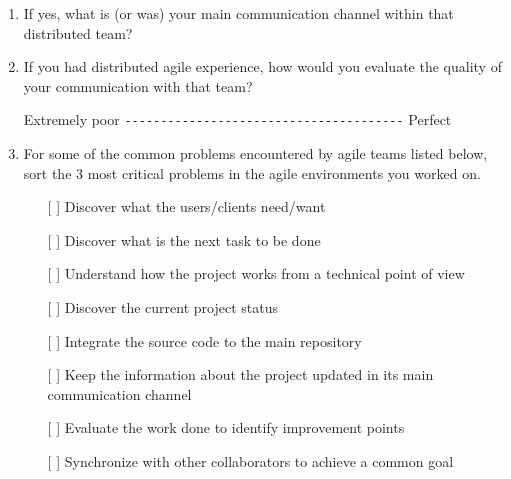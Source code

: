 \documentclass[lnbip]{svmultln}
\begin{document}
\begin{enumerate}
\item If yes, what is (or was) your main communication channel within
  that distributed team?
  \vspace{10pt}

\item If you had distributed agile experience, how would you evaluate
  the quality of your communication with that team?

  Extremely poor \verb=---------------------------------------=
  Perfect \vspace{10pt}

\item For some of the common problems encountered by agile teams
  listed below, sort the 3 most critical problems in the agile
  environments you worked on.
  \begin{itemize}
  \item[[ ] ] Discover what the users/clients need/want
  \item[[ ] ] Discover what is the next task to be done
  \item[[ ] ] Understand how the project works from a technical point
    of view
  \item[[ ] ] Discover the current project status
  \item[[ ] ] Integrate the source code to the main repository
  \item[[ ] ] Keep the information about the project updated in its
    main communication channel
  \item[[ ] ] Evaluate the work done to identify improvement points
  \item[[ ] ] Synchronize with other collaborators to achieve a common
    goal
  \end{itemize}
  \vspace{10pt}


\end{enumerate}
\end{document}
